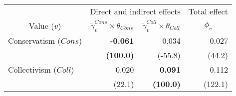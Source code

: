
\begin{tabular}{lrrr}
\toprule
\multicolumn{1}{c}{ } & \multicolumn{2}{c}{Direct and indirect effects} & \multicolumn{1}{c}{Total effect} \\
\cmidrule(l{3pt}r{3pt}){2-3} \cmidrule(l{3pt}r{3pt}){4-4}
\multicolumn{1}{c}{Value ($v$)} & \multicolumn{1}{c}{$\widetilde{\gamma}^{Cons}_v \times \theta_{Cons}$} & \multicolumn{1}{c}{$\widetilde{\gamma}^{Coll}_v \times \theta_{Coll}$} & \multicolumn{1}{c}{${\phi}_v$}\\
\midrule
Conservatism ($Cons$) & \textbf{-0.061} & 0.034 & -0.027\\
 & \textbf{(100.0)} & (-55.8) & (44.2)\\
Collectivism ($Coll$) & 0.020 & \textbf{0.091} & 0.112\\
 & (22.1) & \textbf{(100.0)} & (122.1)\\
\bottomrule
\end{tabular}

